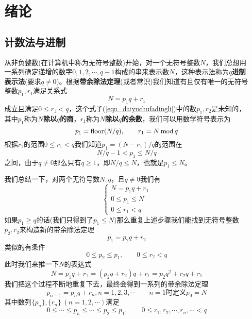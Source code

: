 \chapter*{绪论}
\section*{计数法与进制}
\par 从非负整数(在计算机中称为无符号整数)开始，对一个无符号整数$N$，我们总想用一系列确定递增的数字$0,1,2,\cdots,q-1$构成的串来表示数$N$，这种表示法称为\textbf{$q$进制表示法}(要求$q\neq 0$)。根据\textbf{带余除法定理}(或者常识)我们知道有且仅有唯一的无符号整数$p_1,r_1$满足关系式
\begin{equation}\label{eqn_daiyuchufadingli}
    N=p_1q+r_1
\end{equation}
成立且满足$0\leq r_1<q$，这个式子(\ref{eqn_daiyuchufadingli})中的数$p_1,r_2$是未知的，其中$p_1$称为\textbf{$N$除以$q$的商}，$r_1$称为\textbf{$N$除以$q$的余数}，我们可以用数学符号表示为
\begin{equation}
    p_1=\mathop{\rm floor}(N/q),\qquad r_1=N\mod q
\end{equation}
根据$r_1$的范围$0\leq r_1<q$我们知道$p_1=(N-r_1)/q$的范围在
$$
    N/q-1<p_1\leq N/q
$$
之间，由于$q\neq 0$那么只有$q\geq 1$，即$N/q\leq N$，也就是$p_1\leq N$。
\par 我们总结一下，对两个无符号数$N,q$，且$q\neq 0$我们有
\begin{equation}
    \begin{cases}N=p_1q+r_1\\0\leq p_1\leq N\\0\leq r_1<q\end{cases}
\end{equation}
如果$p_1\geq q$的话(我们只得到了$p_1\leq N$)那么重复上述步骤我们能找到无符号整数$p_2,r_2$来构造新的带余除法定理
\begin{equation}
    p_1=p_2q+r_2
\end{equation}
类似的有条件
$$0\leq p_2\leq p_1,\qquad 0\leq r_2<q$$
此时我们来推一下$N$的表达式
\begin{equation}
        N=p_1q+r_1=(p_2q+r_2)q+r_1=p_2q^2+r_2q+r_1
\end{equation}
我们把这个过程不断地重复下去，最终会得到一系列的带余除法定理
\begin{equation}
    p_{n-1}=p_nq+r_n, n=1,2,3,\cdots\qquad\text{$n=1$时定义$p_0=N$}
\end{equation}
其中数列$\{p_n\},\{r_n\}\ (n=1,2,\cdots)$满足
\begin{equation}
    0\leq\cdots\leq p_n\leq\cdots\leq p_2\leq p_1,\qquad 0\leq r_1,r_2,\cdots,r_n,\cdots< q
\end{equation}
